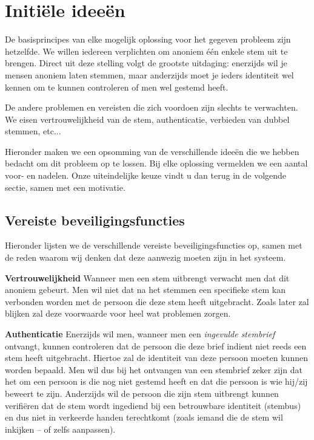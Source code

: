 \documentclass[a4paper,12pt]{article}
\author{Tom Naessens, Enver Bral, Cynric Huys en Felix Van der Jeugt}
\begin{document}


\section{Initi\"ele idee\"en}

De basisprincipes van elke mogelijk oplossing voor het gegeven probleem zijn
hetzelfde. We willen iedereen verplichten om anoniem \'e\'en enkele stem uit te
brengen. Direct uit deze stelling volgt de grootste uitdaging: enerzijds wil
je mensen anoniem laten stemmen, maar anderzijds moet je ieders identiteit wel
kennen om te kunnen controleren of men wel gestemd heeft.

De andere problemen en vereisten die zich voordoen zijn slechts te verwachten.
We eisen vertrouwelijkheid van de stem, authenticatie, verbieden van dubbel
stemmen, etc...

Hieronder maken we een opsomming van de verschillende idee\"en die we hebben
bedacht om dit probleem op te lossen. Bij elke oplossing vermelden we een aantal
voor- en nadelen. Onze uiteindelijke keuze vindt u dan terug in de volgende
sectie, samen met een motivatie.

\subsection{Vereiste beveiligingsfuncties}

Hieronder lijsten we de verschillende vereiste beveiligingsfuncties op, samen
met de reden waarom wij denken dat deze aanwezig moeten zijn in het systeem.

\textbf{Vertrouwelijkheid} Wanneer men een stem uitbrengt verwacht men dat
dit anoniem gebeurt. Men wil niet dat na het stemmen een specifieke stem kan
verbonden worden met de persoon die deze stem heeft uitgebracht. Zoals later zal
blijken zal deze voorwaarde voor heel wat problemen zorgen.

\textbf{Authenticatie} Enerzijds wil men, wanneer men een \emph{ingevulde
stembrief} ontvangt, kunnen controleren dat de persoon die deze brief indient
niet reeds een stem heeft uitgebracht. Hiertoe zal de identiteit van deze
persoon moeten kunnen worden bepaald. Men wil dus bij het ontvangen van een
stembrief zeker zijn dat het om een persoon is die nog niet gestemd heeft en
dat die persoon is wie hij/zij beweert te zijn. Anderzijds wil de persoon die
zijn stem uitbrengt kunnen verifi\"eren dat de stem wordt ingediend bij een
betrouwbare identiteit (stembus) en dus niet in verkeerde handen terechtkomt
(zoals iemand die de stem wil inkijken -- of zelfs aanpassen).
\end{document}
